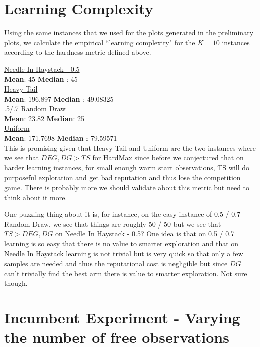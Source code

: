 \documentclass[11pt,letterpaper]{article}
\begin{document}


\section*{Learning Complexity}

Using the same instances that we used for the plots generated in the preliminary plots, we calculate the empirical ``learning complexity" for the $K = 10$ instances according to the hardness metric defined above.

\vspace{0.5cm}
\noindent \underline{Needle In Haystack - 0.5} \\ \textbf{Mean}:  45 \textbf{Median} : 45 \\
\underline{Heavy Tail} \\ \textbf{Mean}:  196.897  \textbf{Median} : 49.08325 \\
\underline{.5/.7 Random Draw} \\ \textbf{Mean}:  23.82 \textbf{Median}: 25  \\
\underline{Uniform} \\ \textbf{Mean}:  171.7698 \textbf{Median} : 79.59571  \\

\vspace{0.5cm}
This is promising given that Heavy Tail and Uniform are the two instances where we see that $DEG, DG > TS$ for HardMax since before we conjectured that on harder learning instances, for small enough warm start observations, TS will do purposeful exploration and get bad reputation and thus lose the competition game. There is probably more we should validate about this metric but need to think about it more.

One puzzling thing about it is, for instance, on the easy instance of 0.5 / 0.7 Random Draw, we see that things are roughly 50 / 50 but we see that $TS > DEG, DG$ on Needle In Haystack - 0.5? One idea is that on 0.5 / 0.7 learning is so easy that there is no value to smarter exploration and that on Needle In Haystack learning is not trivial but is very quick  so that only a few samples are needed and thus the reputational cost is negligible but since $DG$ can't trivially find the best arm there is value to smarter exploration. Not sure though.

\section*{Incumbent Experiment - Varying the number of free observations}
\end{document}

